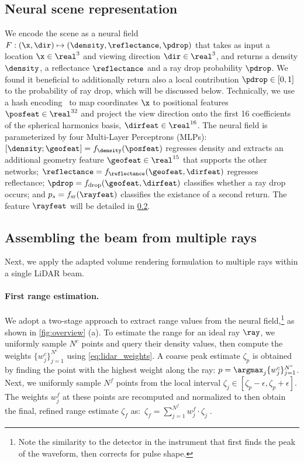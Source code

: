 \subsection{Neural scene representation}\label{sec:neural_scene_rep}
We encode the scene as a neural field $F: (\x, \dir) \mapsto (\density, \reflectance, \pdrop)$ that takes as input a location $\x \in \real^3$ and viewing direction $\dir \in \real^3$, and returns a density $\density$, a reflectance $\reflectance$ and a ray drop probability $\pdrop$. We found it beneficial to additionally return also a local contribution $\pdrop \in [0, 1]$ to the probability of ray drop, which will be discussed below.
Technically, we use a hash encoding~\cite{muller2022instant} to map coordinates $\x$ to positional features $\posfeat \in \real^{32}$ and project the view direction onto the first 16 coefficients of the spherical harmonics basis, $\dirfeat \in \real^{16}$. The neural field is parameterized by four Multi-Layer Perceptrons (MLPs): $[\density; \geofeat] = f_\density(\posfeat)$ regresses density and extracts an additional geometry feature $\geofeat \in \real^{15}$ that supports the other networks; $\reflectance = f_{\reflectance}(\geofeat, \dirfeat)$ regresses reflectance; $\pdrop = f_{\text{drop}}(\geofeat, \dirfeat)$ classifies whether a ray drop occurs; and  $p_s = f_{\text{sr}}(\rayfeat)$ classifies the existance of a second return. The feature $\rayfeat$ will be detailed in \cref{sec:render_lidar}.





\subsection{Assembling the beam from multiple rays}
\label{sec:render_lidar}
Next, we apply the adapted volume rendering formulation to multiple rays within a single LiDAR beam.


\paragraph{First range estimation.}
We adopt a two-stage approach to extract range values from the neural field,\footnote{Note the similarity to the detector in the instrument that first finds the peak of the waveform, then corrects for pulse shape.} as shown in \cref{fig:overview} (a).
To estimate the range for an ideal ray $\ray$, we uniformly sample $N^c$ points and query their density values, then compute the weights $\{w^c_j\}_{j=1}^{N^c}$ using \cref{eq:lidar_weights}. A coarse peak estimate $\zeta_p$ is obtained by finding the point with the highest weight along the ray: $p = \argmax_j \{w^c_j\}_{j=1}^{N^c} $. Next, we uniformly sample $N^f$ points from the local interval $\zeta_j \in [\zeta_p - \epsilon, \zeta_p + \epsilon]$. The weights $w_j^f$ at these points are recomputed and normalized to then obtain the final, refined range estimate $\zeta_f$ as:~$\zeta_f = \sum_{j=1}^{N^f} w^f_j \cdot \zeta_j\;.$



